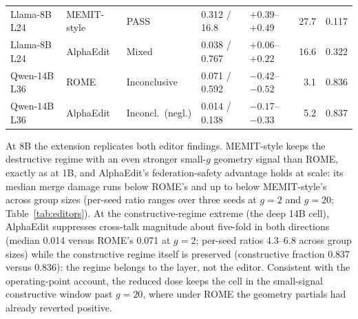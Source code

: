 \documentclass[preprint,12pt]{elsarticle}
\begin{document}
\begin{table}[htbp]
{\begin{tabular}{lllllrr}
Llama-8B L24 & MEMIT-style   & PASS & 0.312 / 16.8 & $+0.39$--$+0.49$ & 27.7 & 0.117 \\
Llama-8B L24 & AlphaEdit     & Mixed & 0.038 / 0.767 & $+0.06$--$+0.22$ & 16.6 & 0.322 \\
Qwen-14B L36 & ROME          & Inconclusive & 0.071 / 0.592 & $-0.42$--$-0.52$ & 3.1 & 0.836 \\
Qwen-14B L36 & AlphaEdit     & Inconcl.~(negl.) & 0.014 / 0.138 & $-0.17$--$-0.33$ & 5.2 & 0.837 \\
\bottomrule
\end{tabular}
}
\end{table}

At 8B the extension replicates both editor findings. MEMIT-style keeps the destructive
regime with an even stronger small-$g$ geometry signal than ROME, exactly as at 1B, and
AlphaEdit's federation-safety advantage holds at scale: its median merge damage runs
\alphaSuppressEightBRome{} below ROME's and up to \alphaSuppressEightBMemit{} below
MEMIT-style's across group sizes (per-seed ratio ranges over three seeds at $g{=}2$ and
$g{=}20$; Table~\ref{tab:editors}).
At the constructive-regime extreme (the deep 14B cell), AlphaEdit suppresses cross-talk
magnitude about five-fold in both directions (median 0.014 versus ROME's 0.071 at
$g{=}2$; per-seed ratios 4.3--6.8 across group sizes) while the constructive regime itself
is preserved (constructive fraction 0.837
versus 0.836): the regime belongs to the layer, not the editor. Consistent with the
operating-point account, the reduced dose keeps the cell in the small-signal
constructive window past $g{=}20$, where under ROME the geometry partials had already
reverted positive.
\end{document}

